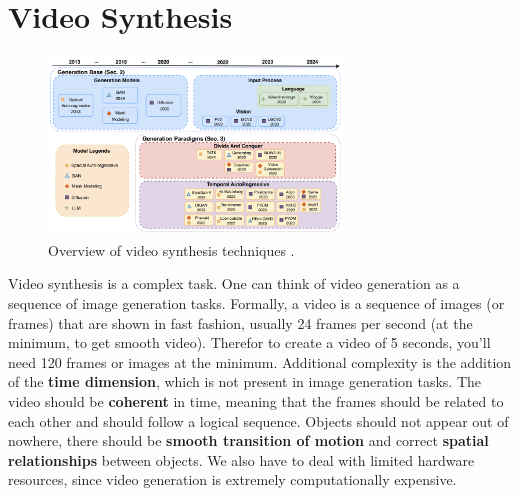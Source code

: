 \section{Video Synthesis}
\label{sec:video_synthesis}

\begin{figure}
    \centering
    \includegraphics[width=0.7\textwidth]{images/video_synthesis/techniques.png}
    \caption{Overview of video synthesis techniques \cite{long_video_survey}.}
    \label{fig:video_synthesis_techniques}
\end{figure}

Video synthesis is a complex task. One can think of video generation as a sequence of image generation tasks. Formally, a video is a sequence of images (or frames) that are shown in fast fashion, usually 24 frames per second (at the minimum, to get smooth video). Therefor to create a video of 5 seconds, you'll need 120 frames or images at the minimum. Additional complexity is the addition of the \textbf{time dimension}, which is not present in image generation tasks. The video should be \textbf{coherent} in time, meaning that the frames should be related to each other and should follow a logical sequence. Objects should not appear out of nowhere, there should be \textbf{smooth transition of motion} and correct \textbf{spatial relationships} between objects. We also have to deal with limited hardware resources, since video generation is extremely computationally expensive.

% 




